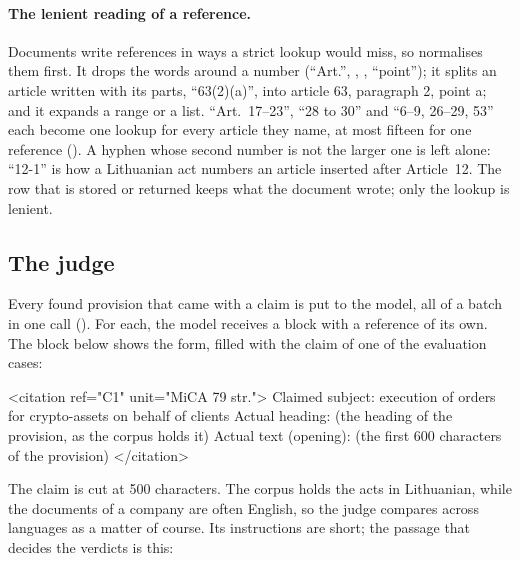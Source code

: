 \paragraph{The lenient reading of a reference.} Documents write references in ways a strict
lookup would miss, so  normalises them first. It drops the words around
a number (\enquote{Art.}, , , \enquote{point}); it splits an
article written with its parts, \enquote{63(2)(a)}, into article 63, paragraph 2, point a; and
it expands a range or a list. \enquote{Art.~17--23}, \enquote{28 to 30} and \enquote{6--9,
26--29, 53} each become one lookup for every article they name, at most fifteen for one
reference (). A hyphen whose second number is not the larger one is
left alone: \enquote{12-1} is how a Lithuanian act numbers an article inserted after
Article~12. The row that is stored or returned keeps what the document wrote; only the lookup
is lenient.

\subsection{The judge}\label{sec:company:judge}

Every found provision that came with a claim is put to the model, all of a batch in one call
(). For each, the model receives a block with a reference of its own. The block
below shows the form, filled with the claim of one of the evaluation cases:

\begin{codeblock}
<citation ref="C1" unit="MiCA 79 str.">
Claimed subject: execution of orders for crypto-assets on behalf of clients
Actual heading: (the heading of the provision, as the corpus holds it)
Actual text (opening): (the first 600 characters of the provision)
</citation>
\end{codeblock}

The claim is cut at 500 characters. The corpus holds the acts in Lithuanian, while the
documents of a company are often English, so the judge compares across languages as a matter
of course. Its instructions are short; the passage that decides the verdicts is this:

